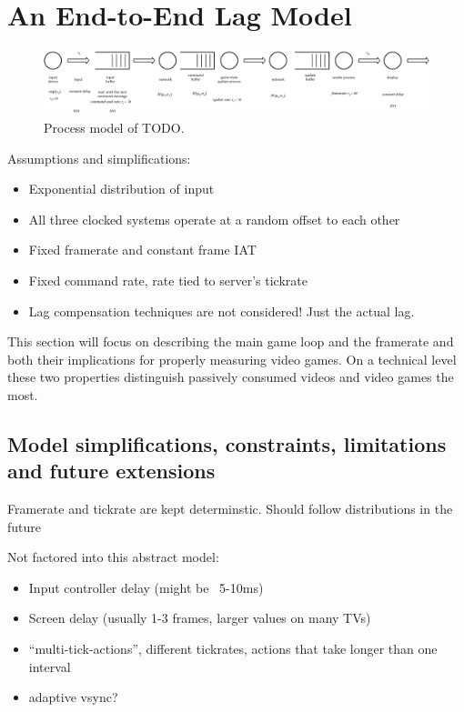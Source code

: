 \section{An End-to-End Lag Model}
\label{sec:model}




\begin{figure}[!t]
	\centering
	\includegraphics[width=1.0\columnwidth]{../models/e2e-lag-model.pdf}
	\caption{Process model of TODO.}
\label{fig:queuing-model}
\end{figure}

Assumptions and simplifications:
\begin{itemize}
	\item Exponential distribution of input
	\item All three clocked systems operate at a random offset to each other
	\item Fixed framerate and constant frame \gls{IAT}
	\item Fixed command rate, rate tied to server's tickrate
	\item Lag compensation techniques are not considered! Just the actual lag.
\end{itemize}



This section will focus on describing the main game loop and the framerate and both their implications for properly measuring video games. On a technical level these two properties distinguish passively consumed videos and video games the most.

\subsection{Model simplifications, constraints, limitations and future extensions}

Framerate and tickrate are kept determinstic. Should follow distributions in the future

Not factored into this abstract model:

\begin{itemize}
	\item Input controller delay (might be ~5-10ms)
	\item Screen delay (usually 1-3 frames, larger values on many TVs)
	\item ``multi-tick-actions'', different tickrates, actions that take longer than one interval
	\item adaptive vsync?
\end{itemize}





